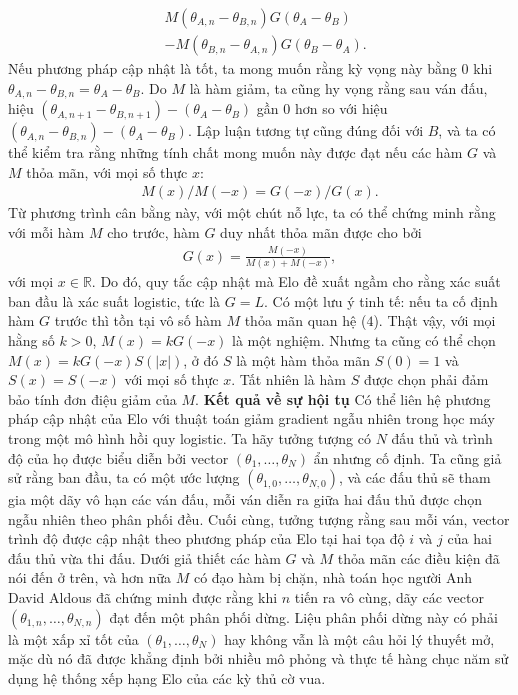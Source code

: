 \begin{multicols}{2}
	\begin{align*}
		&M(\theta_{A, n} - \theta_{B, n}) G(\theta_A - \theta_B)\\
		&- M(\theta_{B, n} - \theta_{A, n}) G(\theta_B - \theta_A).
	\end{align*}
	Nếu phương pháp cập nhật là tốt, ta mong muốn rằng kỳ vọng này bằng $0$ khi $\theta_{A, n} - \theta_{B, n} = \theta_A - \theta_B$. Do $M$ là hàm giảm, ta cũng hy vọng rằng sau ván đấu, hiệu $(\theta_{A, n + 1} - \theta_{B, n + 1}) - (\theta_A - \theta_B)$ gần $0$ hơn so với hiệu $(\theta_{A, n} - \theta_{B, n}) - (\theta_A - \theta_B)$.
	\vskip 0.01cm
	Lập luận tương tự cũng đúng đối với $B$, và ta có thể kiểm tra rằng những tính chất mong muốn này được đạt nếu các hàm $G$ và $M$ thỏa mãn, với mọi số thực $x$:
	\begin{align*}
		M(x) / M(-x) = G(-x) / G(x). \tag{$4$}
	\end{align*}
	Từ phương trình cân bằng này, với một chút nỗ lực, ta có thể chứng minh rằng với mỗi hàm $M$ cho trước, hàm $G$ duy nhất thỏa mãn được cho bởi
	\begin{align*}
		G(x) = \frac { M(-x) }{ M(x) + M(-x) },
	\end{align*}
	với mọi $x \in \mathbb R$.
	\vskip 0.01cm
	Do đó, quy tắc cập nhật mà Elo đề xuất ngầm cho rằng xác suất ban đầu là xác suất logistic, tức là $G = L$.
	\vskip 0.01cm
	Có một lưu ý tinh tế: nếu ta cố định hàm $G$ trước thì tồn tại vô số hàm $M$ thỏa mãn quan hệ ($4$). Thật vậy, với mọi hằng số $k > 0$, $M(x) = k G(-x)$ là một nghiệm. Nhưng ta cũng có thể chọn $M(x) = k G(-x) S(|x|)$, ở đó $S$ là một hàm thỏa mãn $S(0) = 1$ và $S(x) = S(-x)$ với mọi số thực $x$. Tất nhiên là hàm $S$ được chọn phải đảm bảo tính đơn điệu giảm của $M$.
	\vskip 0.05cm
	\textbf{\color{toanhocdoisong}Kết quả về sự hội tụ}
	\vskip 0.05cm
	Có thể liên hệ phương pháp cập nhật của Elo với thuật toán giảm gradient ngẫu nhiên trong học máy trong một mô hình hồi quy logistic.
	\vskip 0.05cm
	Ta hãy tưởng tượng có $N$ đấu thủ và trình độ của họ được biểu diễn bởi vector $(\theta_1, \dots, \theta_N)$ ẩn nhưng cố định. Ta cũng giả sử rằng ban đầu, ta có một ước lượng $(\theta_{1, 0}, \dots, \theta_{N, 0})$, và các đấu thủ sẽ tham gia một dãy vô hạn các ván đấu, mỗi ván diễn ra giữa hai đấu thủ được chọn ngẫu nhiên theo phân phối đều. Cuối cùng, tưởng tượng rằng sau mỗi ván, vector trình độ được cập nhật theo phương pháp của Elo tại hai tọa độ $i$ và $j$ của hai đấu thủ vừa thi đấu.
	\vskip 0.05cm
	Dưới giả thiết các hàm $G$ và $M$ thỏa mãn các điều kiện đã nói đến ở trên, và hơn nữa $M$ có đạo hàm bị chặn, nhà toán học người Anh David Aldous đã chứng minh được rằng khi $n$ tiến ra vô cùng, dãy các vector $(\theta_{1, n}, \dots, \theta_{N, n})$ đạt đến một phân phối dừng. Liệu phân phối dừng này có phải là một xấp xỉ tốt của $(\theta_1, \dots, \theta_N)$ hay không vẫn là một câu hỏi lý thuyết mở, mặc dù nó đã được khẳng định bởi nhiều mô phỏng và thực tế hàng chục năm sử dụng hệ thống xếp hạng Elo của các kỳ thủ cờ vua.

\end{multicols}
